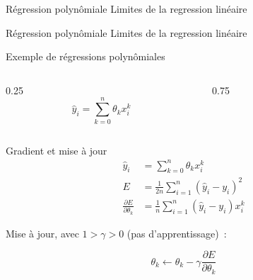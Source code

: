 
\begin{frame}{Régression polynômiale}
  Limites de la regression linéaire
\end{frame}

\begin{frame}{Régression polynômiale}
  Limites de la regression linéaire
\end{frame}

\begin{frame}{Exemple de régressions polynômiales}
  \begin{columns}
    \begin{column}{0.25\tw}
      \[
        \hat{y}_i = \sum_{k = 0}^n \theta_k x_i^k
      \]
    \end{column}
    \begin{column}{0.75\tw}
    \end{column}
  \end{columns}
\end{frame}

\begin{frame}{Gradient et mise à jour}
  \begin{align*}
    \hat{y}_i & = \sum_{k = 0}^n \theta_k x_i^k \\
    E & = \frac{1}{2n} \sum_{i=1}^n (\hat{y}_i - y_i)^2 \\
    \frac{\partial{E}}{\partial{\theta_k}} & = \frac{1}{n} \sum_{i=1}^n (\hat{y}_i - y_i) x_i^k
  \end{align*}

  Mise à jour, avec $1 > \gamma > 0$ (pas d'apprentissage)~:

  \[
    \theta_k \leftarrow \theta_k - \gamma\frac{\partial{E}}{\partial{\theta_k}}
  \]
\end{frame}
